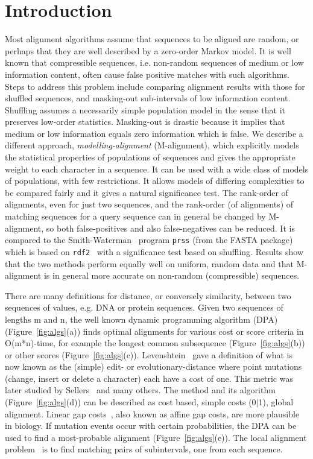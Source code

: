 \documentclass[a4paper,11pt,oneside]{article}
\begin{document}
\section{Introduction}
\label{sec:intro}

Most alignment algorithms assume that sequences to be aligned are random,
or perhaps that they are well described by a zero-order Markov model.
It is well known that compressible sequences,
i.e. non-random sequences of medium or low information content,
often cause false positive matches with such algorithms.
Steps to address this problem include
comparing alignment results with those for shuffled sequences, and
masking-out sub-intervals of low information content.
Shuffling assumes a necessarily simple population model in the sense that it preserves low-order statistics.
Masking-out is drastic because it implies that
medium or low information equals zero information which is false.
We describe a different approach, {\em modelling-alignment} (M-alignment), which explicitly models
the statistical properties of populations of sequences and
gives the appropriate weight to each character in a sequence.
It can be used with a wide class of models of populations,
with few restrictions.
It allows models of differing complexities to be compared fairly and
it gives a natural significance test.
The rank-order of alignments, even for just two sequences, and
the rank-order (of alignments) of matching sequences for a query sequence
can in general
be changed by M-alignment, so both false-positives and also false-negatives can be reduced.
It is compared to the Smith-Waterman~\cite{smith81} program \verb!prss! (from the FASTA
package) which is based on \verb!rdf2!~\cite{pearson88}
with a significance test based on shuffling.
Results show that the two methods perform equally well on uniform, random data and
that M-alignment is in general more accurate on non-random (compressible) sequences.

There are many definitions for
distance, or conversely similarity, between two
sequences of values, e.g. DNA or protein sequences.
Given two sequences of lengths m and n,
the well known dynamic programming algorithm (DPA) (Figure~\ref{fig:algs}(a)) finds
optimal alignments for various cost or score criteria in O(m*n)-time,
for example the longest common subsequence (Figure~\ref{fig:algs}(b)) or
other scores (Figure~\ref{fig:algs}(c)).
Levenshtein~\cite{levenshtein66} gave a definition of what is now known as the
(simple) edit- or evolutionary-distance where point mutations
(change, insert or delete a character) each have a cost of one.
This metric was later studied by Sellers~\cite{sellers74} and many others.
The method and its algorithm (Figure~\ref{fig:algs}(d)) can be described as cost based, simple costs (0$|$1), global alignment.
Linear gap costs~\cite{gotoh82}, also known as affine gap costs, are more plausible in biology.
If mutation events occur with certain probabilities,
the DPA can be used to find a most-probable alignment (Figure~\ref{fig:algs}(e)).
The local alignment problem~\cite{sellers80} is to find
matching pairs of subintervals, one from each sequence.
\end{document}
